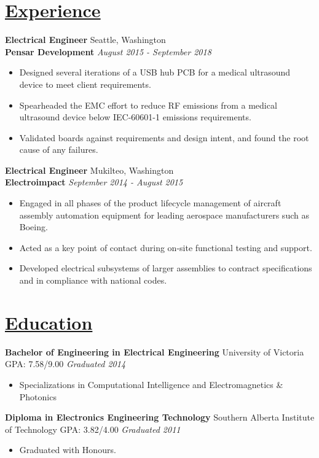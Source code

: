 \documentclass[a4paper, 11pt]{article}
\begin{document}
\section{\underline{Experience}}
  \textbf{Electrical Engineer}
  \hfill
  Seattle, Washington \\
  \textbf{Pensar Development}
  \hfill
  \emph{August 2015 - September 2018}
  \begin{itemize}[nosep]
    \item Designed several iterations of a USB hub PCB for a medical ultrasound device to meet client requirements.
    \item Spearheaded the EMC effort to reduce RF emissions from a medical ultrasound device below IEC-60601-1 emissions requirements.
    \item Validated boards against requirements and design intent, and found the root cause of any failures.
  \end{itemize}
  \bigskip
  
  \textbf{Electrical Engineer}
  \hfill
  Mukilteo, Washington \\
  \textbf{Electroimpact}
  \hfill
  \emph{September 2014 - August 2015}
  \begin{itemize}[nosep]
    \item Engaged in all phases of the product lifecycle management of aircraft assembly automation equipment for leading aerospace manufacturers such as Boeing.
    \item Acted as a key point of contact during on-site functional testing and support.
    \item Developed electrical subsystems of larger assemblies to contract specifications and in compliance with national codes.
  \end{itemize}

\section{\underline{Education}}
  \textbf{Bachelor of Engineering in Electrical Engineering}
  \hfill
  University of Victoria\\
  GPA: 7.58/9.00
  \hfill
  \emph{Graduated 2014}
  \begin{itemize}[nosep]
    \item Specializations in Computational Intelligence and Electromagnetics \& Photonics
  \end{itemize}
  \bigskip
  
  \textbf{Diploma in Electronics Engineering Technology}
  \hfill
  Southern Alberta Institute of Technology
  GPA: 3.82/4.00
  \hfill
  \emph{Graduated 2011}
  \begin{itemize}[nosep]
    \item Graduated with Honours.
  \end{itemize}
  
\end{document}
